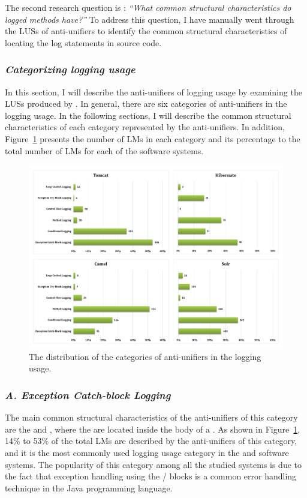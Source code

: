 The second research question is : \emph{``What common structural characteristics do logged methods have?''}
To address this question, I have manually went through the LUSs of anti-unifiers to identify the common structural characteristics of locating the log statements in source code. 

  
\subsubsection{\emph{Categorizing logging usage}}
In this section, I will describe the anti-unifiers of logging usage by examining the LUSs produced by . In general, there are six categories of anti-unifiers in the logging usage. In the following sections, I will describe the common structural characteristics of each category represented by the anti-unifiers. In addition, Figure~\ref{fig:categories} presents the number of LMs in each category and its percentage to the total number of LMs for each of the software systems. 

\begin{figure} [H]
  \centering\includegraphics [width = 1\textwidth]{Charts/Categories.png}
  \caption{The distribution of the categories of anti-unifiers in the logging usage.}
  \label{fig:categories}
\end{figure}


\subsubsection{\emph{A. Exception Catch-block Logging}}  \label{Exception catch-block logging}
The main common structural characteristics of the anti-unifiers of this category are the  and  , where the  are located inside the body of a . As shown in Figure~\ref{fig:categories}, 14\% to 53\% of the total LMs are described by the anti-unifiers of this category, and it is the most commonly used logging usage category in the  and  software systems. The popularity of this category among all the studied systems is due to the fact that exception handling using the / blocks is a common error handling technique in the Java programming language.

